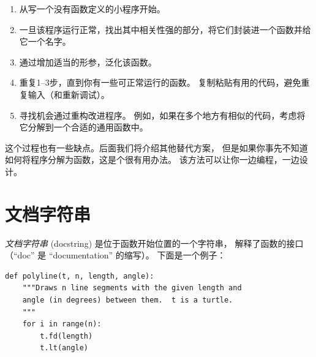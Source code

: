 \begin{enumerate}

\item 从写一个没有函数定义的小程序开始。

\item 一旦该程序运行正常，找出其中相关性强的部分，将它们封装进一个函数并给它一个名字。

\item 通过增加适当的形参，泛化该函数。

\item 重复1–3步，直到你有一些可正常运行的函数。
   复制粘贴有用的代码，避免重复输入（和重新调试）。

\item 寻找机会通过重构改进程序。
   例如，如果在多个地方有相似的代码，考虑将它分解到一个合适的通用函数中。

\end{enumerate}


这个过程也有一些缺点。后面我们将介绍其他替代方案，
但是如果你事先不知道如何将程序分解为函数，这是个很有用办法。
该方法可以让你一边编程，一边设计。

\section{文档字符串}
\label{docstring}


\emph{文档字符串} (docstring) 是位于函数开始位置的一个字符串，
解释了函数的接口（``doc'' 是 ``documentation'' 的缩写）。 下面是一个例子：

\begin{lstlisting}
def polyline(t, n, length, angle):
    """Draws n line segments with the given length and
    angle (in degrees) between them.  t is a turtle.
    """
    for i in range(n):
        t.fd(length)
        t.lt(angle)
\end{lstlisting}

